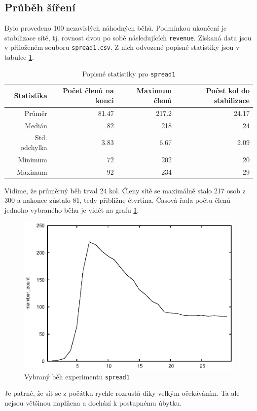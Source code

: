 \documentclass[a4wide,12pt]{report}
\begin{document}
\subsection{Průběh šíření}
Bylo provedeno 100 nezavislých náhodných běhů. Podmínkou ukončení je stabilizace sítě, tj. rovnost dvou po sobě následujících \texttt{revenue}. Získaná data jsou v přiloženém souboru \texttt{spread1.csv}. Z nich odvozené popisné statistiky jsou v tabulce \ref{tab:spread1_desc}.
\begin{table}[h]
  \begin{center}
  \begin{tabular}{|r|r|r|r|}
  \hline
  Statistika&Počet členů na konci	&Maximum členů	&Počet kol do stabilizace\\\hline
  Průměr	&81.47	&217.2	&24.17\\\hline
  Medián	&82	&218	&24\\\hline
  Std. odchylka	&3.83	&6.67	&2.09\\\hline
  Minimum	&72	&202	&20\\\hline
  Maximum	&92	&234	&29\\\hline
  \end{tabular}
  \end{center}
  \caption{Popisné statistiky pro \texttt{spread1}}
  \label{tab:spread1_desc}
\end{table}
Vidíme, že průměrný běh trval 24 kol. Členy sítě se maximálně stalo 217 osob z 300 a nakonec zůstalo 81, tedy přibližne čtvrtina. Časová řada počtu členů jednoho vybraného běhu je vidět na grafu \ref{fig:spread1_run}.
\begin{figure}[h]
  \centering
  \includegraphics{member_count.eps}
  \caption{Vybraný běh experimentu \texttt{spread1}}
  \label{fig:spread1_run}
\end{figure}
Je patrné, že síť se z počátku rychle rozrůstá díky velkým očekáváním. Ta ale nejsou většinou naplňena a dochází k postupnému úbytku.
\end{document}
